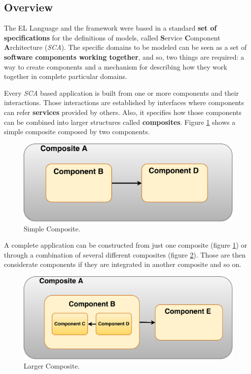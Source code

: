 \documentclass[12pt]{article}
\begin{document}
{\subsection{Overview}

The EL Language and the framework were based in a standard \textbf{set of specifications} for the definitions of models, called  \textbf{S}ervice \textbf{C}omponent \textbf{A}rchitecture (\textit{SCA}). The specific domains to be modeled can be seen as a set of \textbf{software components working together}, and so, two things are required: a way to create components and a mechanism for describing how they work together in complete particular domains. 
 
Every \textit{SCA} based application is built from one or more components and their interactions. Those interactions are established by interfaces where components can refer \textbf{services} provided by others. Also, it specifies how those components can be combined into larger structures called \textbf{composites}. Figure \ref{fig:CompositeModel} shows a simple composite composed by two components.

 \begin{figure}[!htb]
\centering
\includegraphics[scale=0.25]{images/CompositeModel}
\caption{Simple Composite.}
\label{fig:CompositeModel} 
\end{figure}
 
A complete application can be constructed from just one composite (figure \ref{fig:CompositeModel}) or through a combination of several different composites (figure \ref{fig:CompositeModel2}). Those are then considerate components if they are integrated in another composite and so on. 
 
\begin{figure}[H]
\centering
\includegraphics[scale=0.22]{images/CompositeModel2}
\caption{Larger Composite.}
\label{fig:CompositeModel2} 
\end{figure}
 
}
\end{document}
